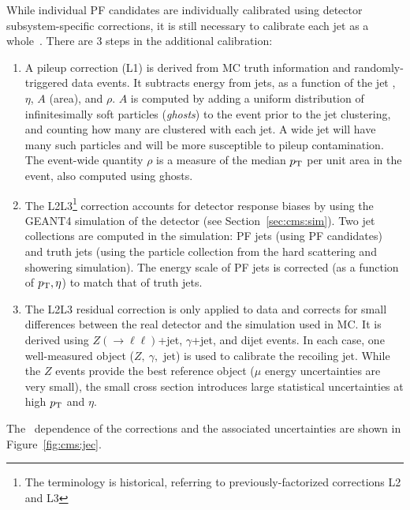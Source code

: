 While individual PF candidates are individually calibrated using detector subsystem-specific corrections, it is still necessary to calibrate each jet as a whole~\cite{jec}.
There are 3 steps in the additional calibration:
\begin{enumerate}
\item A pileup correction (L1) is derived from MC truth information and randomly-triggered data events.
It subtracts energy from jets, as a function of the jet \pt, $\eta$, $A$ (area), and $\rho$. 
$A$ is computed by adding a uniform distribution of infinitesimally soft particles (\emph{ghosts}) to the event prior to the jet clustering, and counting how many are clustered with each jet. 
A wide jet will have many such particles and will be more susceptible to pileup contamination.
The event-wide quantity $\rho$ is a measure of the median $p_\mathrm{T}$ per unit area in the event, also computed using ghosts.

\item The L2L3\footnote{The terminology is historical, referring to previously-factorized corrections L2 and L3} correction accounts for detector response biases by using the GEANT4 simulation of the detector (see Section~\ref{sec:cms:sim}).
Two jet collections are computed in the simulation: PF jets (using PF candidates) and truth jets (using the particle collection from the hard scattering and showering simulation). 
The energy scale of PF jets is corrected (as a function of $p_\mathrm{T},\eta$) to match that of truth jets.

\item The L2L3 residual correction is only applied to data and corrects for small differences between the real detector and the simulation used in MC.
It is derived using $Z(\rightarrow\ell\ell)$+jet, $\gamma$+jet, and dijet events.
In each case, one well-measured object ($Z,~\gamma,$ jet) is used to calibrate the recoiling jet.
While the $Z$ events provide the best reference object ($\mu$ energy uncertainties are very small), the small cross section introduces large statistical uncertainties at high $p_\mathrm{T}$ and $\eta$. 
\end{enumerate}
The \pt~dependence of the corrections and the associated uncertainties are shown in Figure~\ref{fig:cms:jec}.

